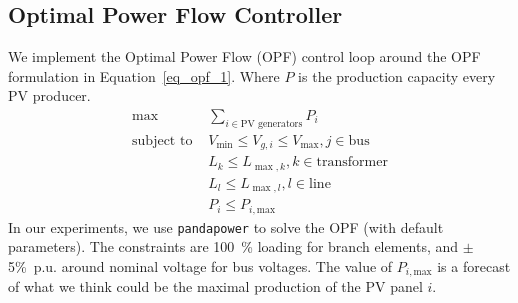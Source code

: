 \documentclass[conference]{IEEEtran}
\begin{document}
\subsection{Optimal Power Flow Controller}\label{opf_controller}

We implement the Optimal Power Flow (OPF) control loop around the OPF formulation in Equation~\eqref{eq_opf_1}. Where $P$ is the production capacity every PV producer.
\begin{equation}\label{eq_opf_1}
\begin{split}
	\max & \sum_{i \in \text{PV generators}}{P_i} \\
	\text{subject to } 
	& V_{\min} \leqslant V_{g,i}  \leqslant V_{\max}, j\in\text{bus} \\
	& L_{k} \leqslant L_{\max,k}, k\in\text{transformer} \\
	& L_{l} \leqslant L_{\max,l}, l\in\text{line}\\
	& P_i \leqslant P_{i,\mathrm{max}}
\end{split}
\end{equation}
In our experiments, we use \texttt{pandapower} to solve the OPF (with default parameters). 
The constraints are 100~\% loading for branch elements, and $\pm$5\%~p.u. around nominal voltage for bus voltages. The value of $P_{i,\text{max}}$ is a forecast of what we think could be the maximal production of the PV panel $i$.


\end{document}
